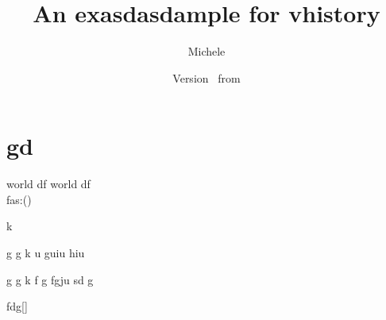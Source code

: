 \documentclass{article}
\author{Michele}
\newcommand{\docTitle}{An exasdasdample for vhistory}
\begin{document}
\section{gd}
	world df \textbf{\gitRel}
	world df \textbf{\gitRel}\\
	fas:\gitRoff(\gitCommitterDate)\\
	\begin{changelog}[author=Michele]
		\begin{version}[version=1.20]
			\added
			\item k
		\end{version}
		
		\begin{version}[version=\gitReln]
			\added
			\item  g g k u guiu  hiu
		\end{version}
		
		\begin{version}[version=\gitReln]
			\added
			\item  g g k f g fgju sd g
		\end{version} 
	\end{changelog}

fdg[\vhCurrentVersion]



	\title{\docTitle}
	\author{\vhListAllAuthors}
	\date{Version \vhCurrentVersion\ from \vhCurrentDate}

	\begin{versionhistory}
	\end{versionhistory}
\newpage
\end{document}
